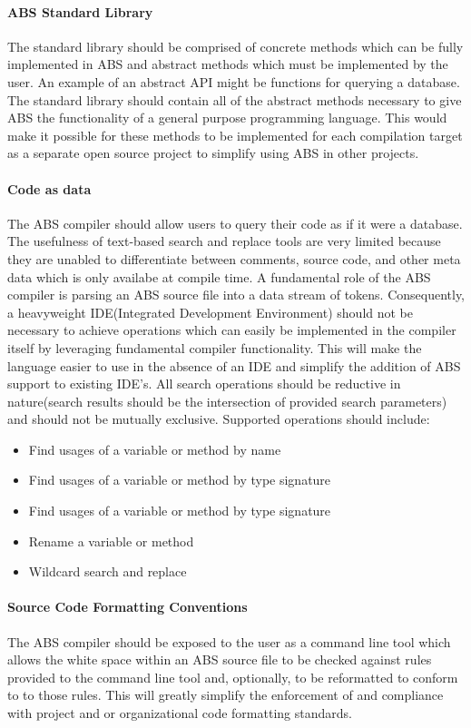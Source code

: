 \documentclass[hidelinks]{article}
\begin{document}
\paragraph{ABS Standard Library} The standard library should be comprised of concrete methods which can be fully implemented in ABS and abstract methods which must be implemented by the user. An example of an abstract API might be functions for querying a database. The standard library should contain all of the abstract methods necessary to give ABS the functionality of a general purpose programming language. This would make it possible for these methods to be implemented for each compilation target as a separate open source project to simplify using ABS in other projects.\paragraph{Code as data}
The ABS compiler should allow users to query their code as if it were a database. The usefulness of text-based search and replace tools are very limited because they are unabled to differentiate between comments, source code, and other meta data which is only availabe at compile time. A fundamental role of the ABS compiler is parsing an ABS source file into a data stream of tokens. Consequently, a heavyweight IDE(Integrated Development Environment) should not be necessary to achieve operations which can easily be implemented in the compiler itself by leveraging fundamental compiler functionality. This will make the language easier to use in the absence of an IDE and simplify the addition of ABS support to existing IDE's. All search operations should be reductive in nature(search results should be the intersection of provided search parameters) and should not be mutually exclusive. Supported operations should include:
\begin{itemize}
	\item Find usages of a variable or method by name
	\item Find usages of a variable or method by type signature
	\item Find usages of a variable or method by type signature
	\item Rename a variable or method
	\item Wildcard search and replace
\end{itemize}
\paragraph{Source Code Formatting Conventions}
The ABS compiler should be exposed to the user as a command line tool which allows the white space within an ABS source file to be checked against rules provided to the command line tool and, optionally, to be reformatted to conform to to those rules. This will greatly simplify the enforcement of and compliance with project and or organizational code formatting standards.
\end{document}
